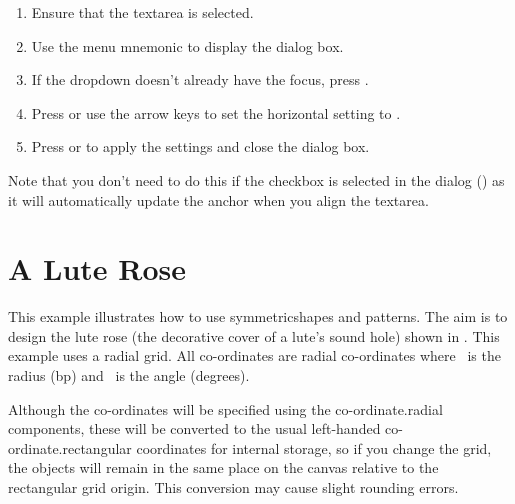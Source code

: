 \begin{enumerate}
\begin{enumerate}
\item Ensure that the \gls{textarea} is selected.

\item Use the menu mnemonic
 to
display the  dialog box.

\item If the \gls{dropdown} doesn't already have the focus,
press .

\item Press  or use the arrow keys to set the
horizontal setting to .

\item Press  or  to apply the settings
and close the dialog box.
\end{enumerate}

Note that you don't need to do this if the
 \gls*{checkbox} is selected
in the  dialog () as it will
automatically update the anchor when you align the \gls*{textarea}.

\end{enumerate}

\section{A Lute Rose}\label{sec:rosetutorial}

This example illustrates how to use \glspl{symmetricshape} and
\glspl{pattern}. The aim is to design the lute rose (the decorative
cover of a lute's sound hole) shown in
. This example uses a radial grid. All
co-ordinates \radialcoords{\radiusmark}{\anglemark} are radial
co-ordinates where \radiusmark\ is the radius (\gls{bp}) and \anglemark\
is the angle (degrees).

\begin{warning}
Although the \glspl{co-ordinate} will be specified using the
\gls{co-ordinate.radial} components, these will be converted to the
usual left-handed \gls{co-ordinate.rectangular} coordinates for
internal storage, so if you change the \gls{grid}, the objects will
remain in the same place on the \gls{canvas} relative to the
rectangular grid origin.
This conversion may cause slight rounding errors.
\end{warning}

